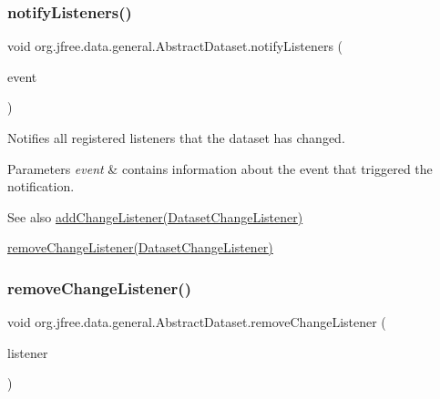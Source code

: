 \subsubsection{\texorpdfstring{notify\+Listeners()}{notifyListeners()}}
{\footnotesize\ttfamily void org.\+jfree.\+data.\+general.\+Abstract\+Dataset.\+notify\+Listeners (\begin{DoxyParamCaption}\item[{\mbox{\hyperlink{classorg_1_1jfree_1_1data_1_1general_1_1_dataset_change_event}{Dataset\+Change\+Event}}}]{event }\end{DoxyParamCaption})\hspace{0.3cm}{\ttfamily [protected]}}

Notifies all registered listeners that the dataset has changed.


\begin{DoxyParams}{Parameters}
{\em event} & contains information about the event that triggered the notification.\\
\hline
\end{DoxyParams}
\begin{DoxySeeAlso}{See also}
\mbox{\hyperlink{classorg_1_1jfree_1_1data_1_1general_1_1_abstract_dataset_a98ccd0af41c59cd8fe50543376d0faf9}{add\+Change\+Listener(\+Dataset\+Change\+Listener)}} 

\mbox{\hyperlink{classorg_1_1jfree_1_1data_1_1general_1_1_abstract_dataset_ab0a2ba36de45585c70212701459b5979}{remove\+Change\+Listener(\+Dataset\+Change\+Listener)}} 
\end{DoxySeeAlso}
\mbox{\label{classorg_1_1jfree_1_1data_1_1general_1_1_abstract_dataset_ab0a2ba36de45585c70212701459b5979}} 
\subsubsection{\texorpdfstring{remove\+Change\+Listener()}{removeChangeListener()}}
{\footnotesize\ttfamily void org.\+jfree.\+data.\+general.\+Abstract\+Dataset.\+remove\+Change\+Listener (\begin{DoxyParamCaption}\item[{\mbox{\hyperlink{interfaceorg_1_1jfree_1_1data_1_1general_1_1_dataset_change_listener}{Dataset\+Change\+Listener}}}]{listener }\end{DoxyParamCaption})}

